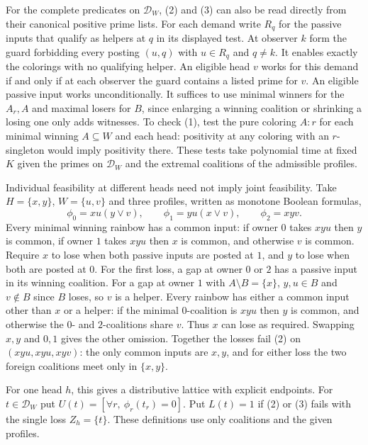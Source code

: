 For the complete predicates on $\mathcal D_W$, (2) and (3) can
also be read directly from their canonical positive prime lists.
For each demand write $R_q$ for the passive inputs that qualify
as helpers at $q$ in its displayed test. At observer $k$ form the
guard forbidding every posting $(u,q)$ with $u\in R_q$ and
$q\ne k$. It enables exactly the colorings with no qualifying helper.
An eligible head $v$ works for this demand if and only if at each
observer the guard contains a listed prime for $v$. An eligible
passive input works unconditionally. It suffices to use minimal
winners for the $A_r,A$ and maximal losers for $B$, since enlarging
a winning coalition or shrinking a losing one only adds witnesses.
To check (1), test the pure coloring $A:r$ for each minimal winning
$A\subseteq W$ and each head: positivity at any coloring with an
$r$-singleton would imply positivity there. These tests take polynomial
time at fixed $K$ given the primes on $\mathcal D_W$ and the extremal
coalitions of the admissible profiles.

Individual feasibility at different heads need not imply joint
feasibility. Take $H=\{x,y\}$, $W=\{u,v\}$ and three profiles, written
as monotone Boolean formulas,
\[
 \phi_0=xu(y\lor v),\qquad \phi_1=yu(x\lor v),\qquad \phi_2=xyv .
\]
Every minimal winning rainbow has a common input: if owner $0$ takes
$xyu$ then $y$ is common, if owner $1$ takes $xyu$ then $x$ is common,
and otherwise $v$ is common. Require $x$ to lose when both passive
inputs are posted at $1$, and $y$ to lose when both are posted at $0$.
For the first loss, a gap at owner $0$ or $2$ has a passive input in
its winning coalition. For a gap at owner $1$ with $A\setminus B=\{x\}$,
$y,u\in B$ and $v\notin B$ since $B$ loses, so $v$ is a helper. Every
rainbow has either a common input other than $x$ or a helper: if the
minimal $0$-coalition is $xyu$ then $y$ is common, and otherwise the
$0$- and $2$-coalitions share $v$. Thus $x$ can lose as required.
Swapping $x,y$ and $0,1$ gives the other omission. Together the losses
fail (2) on $(xyu,xyu,xyv)$: the only common inputs are $x,y$, and for
either loss the two foreign coalitions meet only in $\{x,y\}$.

For one head $h$, this gives a distributive lattice with explicit
endpoints. For $t\in\mathcal D_W$ put $U(t)=[\forall r,\ \phi_r(t_r)=0]$.
Put $L(t)=1$ if (2) or (3) fails with the single loss $Z_h=\{t\}$.
These definitions use only coalitions and the given profiles.

